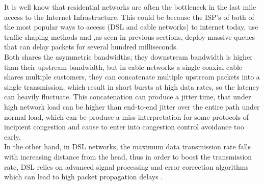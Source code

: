 It is well know that residential networks are often the bottleneck in the last
mile access to the Internet Infrastructure. This could be because the ISP's of
both of the most popular ways to access (DSL and cable networks) to internet
today, use traffic shaping methods and ,as seen in previous sections, deploy
massive queues that can delay packets for several hundred milliseconds.\\

Both shares the asymmetric bandwidths; they downstream bandwidth is higher than
their upstream bandwidth, but in cable networks a single coaxial cable shares
multiple customers, they can concatenate multiple upstream packets into a single
transmission, which result in short bursts at high data rates, so the latency
can heavily fluctuate. This concatenation can produce a jitter time, that under
high network load can be higher than end-to-end jitter over the entire path
under normal load, which can be produce a miss interpretation for some protocols
of incipient congestion and cause to enter into congestion control avoidance too
early.\\

In the other hand, in DSL networks, the maximum data transmission
rate falls with increasing distance from the head, thus in order to boost the
transmission rate, DSL relies on advanced signal processing and error correction
algorithms which can lead to high packet propagation delays .\\


